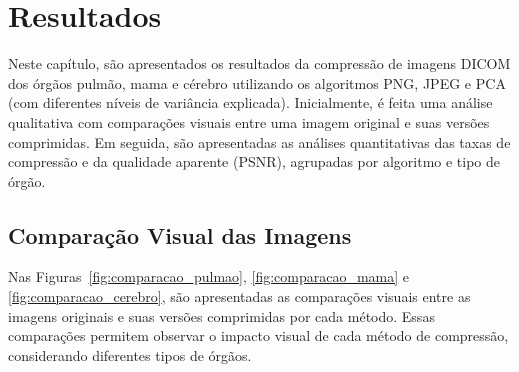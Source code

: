 \chapter{Resultados}
\label{cap:resultados}

Neste capítulo, são apresentados os resultados da compressão de imagens \acrshort{DICOM} dos órgãos pulmão, mama e cérebro utilizando os algoritmos \acrshort{PNG}, \acrshort{JPEG} e \acrshort{PCA} (com diferentes níveis de variância explicada). Inicialmente, é feita uma análise qualitativa com comparações visuais entre uma imagem original e suas versões comprimidas. Em seguida, são apresentadas as análises quantitativas das taxas de compressão e da qualidade aparente (\acrshort{PSNR}), agrupadas por algoritmo e tipo de órgão.

\section{Comparação Visual das Imagens}

Nas Figuras~\ref{fig:comparacao_pulmao}, \ref{fig:comparacao_mama} e \ref{fig:comparacao_cerebro}, são apresentadas as comparações visuais entre as imagens originais e suas versões comprimidas por cada método. Essas comparações permitem observar o impacto visual de cada método de compressão, considerando diferentes tipos de órgãos.

